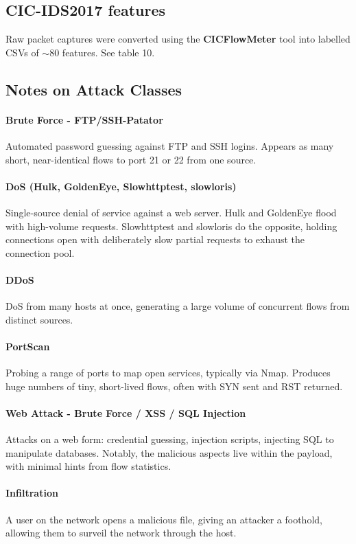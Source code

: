 \documentclass{article}
\begin{document}
\begin{appendices}
\subsection{CIC-IDS2017 features}
Raw packet captures were converted using the \textbf{CICFlowMeter} tool into labelled CSVs of $\sim80$ features. See table 10.

\subsection{Notes on Attack Classes}
\paragraph{Brute Force - FTP/SSH-Patator} Automated password guessing against FTP and SSH logins. Appears as many short, near-identical flows to port 21 or 22 from one source.
\paragraph{DoS (Hulk, GoldenEye, Slowhttptest, slowloris)} Single-source denial of service against a web server. Hulk and GoldenEye flood with high-volume requests. Slowhttptest and slowloris do the opposite, holding connections open with deliberately slow partial requests to exhaust the connection pool.
\paragraph{DDoS} DoS from many hosts at once, generating a large volume of concurrent flows from distinct sources. 
\paragraph{PortScan} Probing a range of ports to map open services, typically via Nmap. Produces huge numbers of tiny, short-lived flows, often with SYN sent and RST returned. 
\paragraph{Web Attack - Brute Force / XSS / SQL Injection} Attacks on a web form: credential guessing, injection scripts, injecting SQL to manipulate databases. Notably, the malicious aspects live within the payload, with minimal hints from flow statistics.
\paragraph{Infiltration} A user on the network opens a malicious file, giving an attacker a foothold, allowing them to surveil the network through the host.

\end{appendices}
\end{document}
